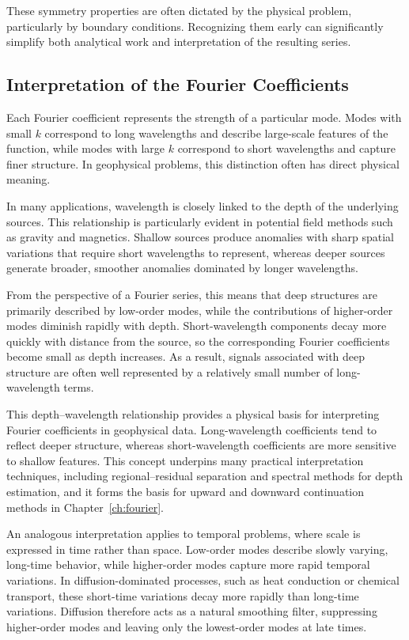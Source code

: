 These symmetry properties are often dictated by the physical problem, particularly by boundary conditions. Recognizing them early can significantly simplify both analytical work and interpretation of the resulting series.

\subsection{Interpretation of the Fourier Coefficients}

Each Fourier coefficient represents the strength of a particular mode. Modes with small $k$ correspond to long wavelengths and describe large-scale features of the function, while modes with large $k$ correspond to short wavelengths and capture finer structure. In geophysical problems, this distinction often has direct physical meaning.

In many applications, wavelength is closely linked to the depth of the underlying sources. This relationship is particularly evident in potential field methods such as gravity and magnetics. Shallow sources produce anomalies with sharp spatial variations that require short wavelengths to represent, whereas deeper sources generate broader, smoother anomalies dominated by longer wavelengths.

From the perspective of a Fourier series, this means that deep structures are primarily described by low-order modes, while the contributions of higher-order modes diminish rapidly with depth. Short-wavelength components decay more quickly with distance from the source, so the corresponding Fourier coefficients become small as depth increases. As a result, signals associated with deep structure are often well represented by a relatively small number of long-wavelength terms.

This depth--wavelength relationship provides a physical basis for interpreting Fourier coefficients in geophysical data. Long-wavelength coefficients tend to reflect deeper structure, whereas short-wavelength coefficients are more sensitive to shallow features. This concept underpins many practical interpretation techniques, including regional--residual separation and spectral methods for depth estimation, and it forms the basis for upward and downward continuation methods in Chapter~\ref{ch:fourier}.

An analogous interpretation applies to temporal problems, where scale is expressed in time rather than space. Low-order modes describe slowly varying, long-time behavior, while higher-order modes capture more rapid temporal variations. In diffusion-dominated processes, such as heat conduction or chemical transport, these short-time variations decay more rapidly than long-time variations. Diffusion therefore acts as a natural smoothing filter, suppressing higher-order modes and leaving only the lowest-order modes at late times.

